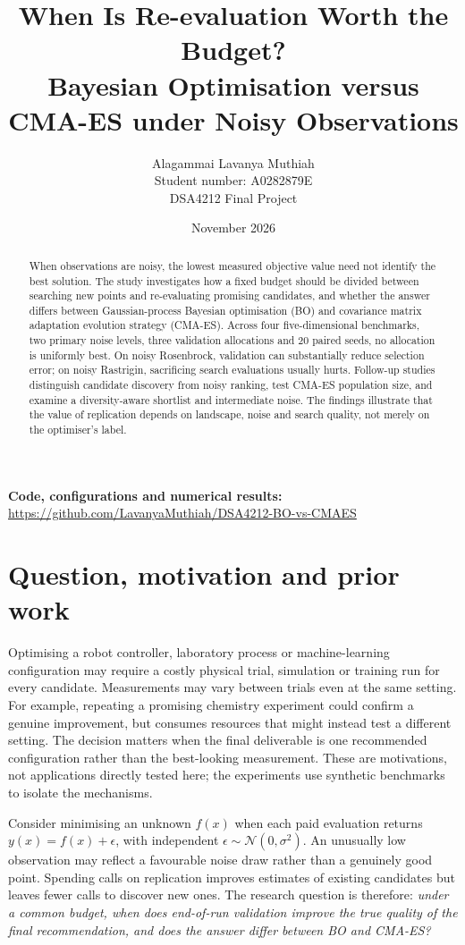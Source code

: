 \documentclass[11pt,a4paper]{article}
\title{\vspace{-1.2cm}\bfseries When Is Re-evaluation Worth the Budget?\\\large Bayesian Optimisation versus CMA-ES under Noisy Observations}
\author{Alagammai Lavanya Muthiah\\Student number: A0282879E\\\small DSA4212 Final Project}
\date{November 2026}
\begin{document}
\maketitle
\vspace{-0.5cm}
\begin{center}\small\textbf{Code, configurations and numerical results:} \url{https://github.com/LavanyaMuthiah/DSA4212-BO-vs-CMAES}\end{center}
\vspace{-0.15cm}
\begin{abstract}\noindent
When observations are noisy, the lowest measured objective value need not identify the best solution. The study investigates how a fixed budget should be divided between searching new points and re-evaluating promising candidates, and whether the answer differs between Gaussian-process Bayesian optimisation (BO) and covariance matrix adaptation evolution strategy (CMA-ES). Across four five-dimensional benchmarks, two primary noise levels, three validation allocations and 20 paired seeds, no allocation is uniformly best. On noisy Rosenbrock, validation can substantially reduce selection error; on noisy Rastrigin, sacrificing search evaluations usually hurts. Follow-up studies distinguish candidate discovery from noisy ranking, test CMA-ES population size, and examine a diversity-aware shortlist and intermediate noise. The findings illustrate that the value of replication depends on landscape, noise and search quality, not merely on the optimiser's label.
\end{abstract}
\vspace{-0.15cm}
\section{Question, motivation and prior work}
Optimising a robot controller, laboratory process or machine-learning configuration may require a costly physical trial, simulation or training run for every candidate. Measurements may vary between trials even at the same setting. For example, repeating a promising chemistry experiment could confirm a genuine improvement, but consumes resources that might instead test a different setting. The decision matters when the final deliverable is one recommended configuration rather than the best-looking measurement. These are motivations, not applications directly tested here; the experiments use synthetic benchmarks to isolate the mechanisms.

Consider minimising an unknown $f(x)$ when each paid evaluation returns $y(x)=f(x)+\epsilon$, with independent $\epsilon\sim\mathcal N(0,\sigma^2)$. An unusually low observation may reflect a favourable noise draw rather than a genuinely good point. Spending calls on replication improves estimates of existing candidates but leaves fewer calls to discover new ones. The research question is therefore: \emph{under a common budget, when does end-of-run validation improve the true quality of the final recommendation, and does the answer differ between BO and CMA-ES?}
\end{document}
